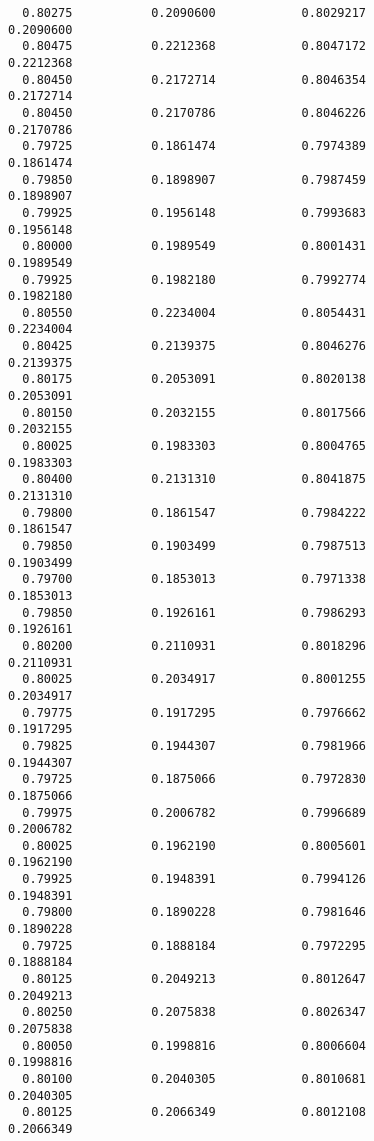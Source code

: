 \documentclass[
  letterpaper,
  DIV=11,
  numbers=noendperiod]{scrartcl}
\begin{document}
\begin{verbatim}
  0.80275           0.2090600            0.8029217            0.2090600     
  0.80475           0.2212368            0.8047172            0.2212368     
  0.80450           0.2172714            0.8046354            0.2172714     
  0.80450           0.2170786            0.8046226            0.2170786     
  0.79725           0.1861474            0.7974389            0.1861474     
  0.79850           0.1898907            0.7987459            0.1898907     
  0.79925           0.1956148            0.7993683            0.1956148     
  0.80000           0.1989549            0.8001431            0.1989549     
  0.79925           0.1982180            0.7992774            0.1982180     
  0.80550           0.2234004            0.8054431            0.2234004     
  0.80425           0.2139375            0.8046276            0.2139375     
  0.80175           0.2053091            0.8020138            0.2053091     
  0.80150           0.2032155            0.8017566            0.2032155     
  0.80025           0.1983303            0.8004765            0.1983303     
  0.80400           0.2131310            0.8041875            0.2131310     
  0.79800           0.1861547            0.7984222            0.1861547     
  0.79850           0.1903499            0.7987513            0.1903499     
  0.79700           0.1853013            0.7971338            0.1853013     
  0.79850           0.1926161            0.7986293            0.1926161     
  0.80200           0.2110931            0.8018296            0.2110931     
  0.80025           0.2034917            0.8001255            0.2034917     
  0.79775           0.1917295            0.7976662            0.1917295     
  0.79825           0.1944307            0.7981966            0.1944307     
  0.79725           0.1875066            0.7972830            0.1875066     
  0.79975           0.2006782            0.7996689            0.2006782     
  0.80025           0.1962190            0.8005601            0.1962190     
  0.79925           0.1948391            0.7994126            0.1948391     
  0.79800           0.1890228            0.7981646            0.1890228     
  0.79725           0.1888184            0.7972295            0.1888184     
  0.80125           0.2049213            0.8012647            0.2049213     
  0.80250           0.2075838            0.8026347            0.2075838     
  0.80050           0.1998816            0.8006604            0.1998816     
  0.80100           0.2040305            0.8010681            0.2040305     
  0.80125           0.2066349            0.8012108            0.2066349     

\end{verbatim}
\end{document}
